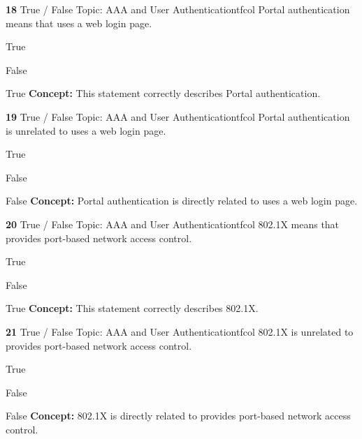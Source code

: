 \documentclass[10pt,a4paper]{article}
\begin{document}
\begin{qcard}{\color{white}\textbf{18} \hfill \small True / False \textbar{} Topic: AAA and User Authentication}{tfcol}
Portal authentication means that uses a web login page.

\begin{qoptions}
\item True
\item False
\end{qoptions}
\begin{explainbox}{True}
\textbf{Concept:} This statement correctly describes Portal authentication.
\end{explainbox}
\end{qcard}

\begin{qcard}{\color{white}\textbf{19} \hfill \small True / False \textbar{} Topic: AAA and User Authentication}{tfcol}
Portal authentication is unrelated to uses a web login page.

\begin{qoptions}
\item True
\item False
\end{qoptions}
\begin{explainbox}{False}
\textbf{Concept:} Portal authentication is directly related to uses a web login page.
\end{explainbox}
\end{qcard}

\begin{qcard}{\color{white}\textbf{20} \hfill \small True / False \textbar{} Topic: AAA and User Authentication}{tfcol}
802.1X means that provides port-based network access control.

\begin{qoptions}
\item True
\item False
\end{qoptions}
\begin{explainbox}{True}
\textbf{Concept:} This statement correctly describes 802.1X.
\end{explainbox}
\end{qcard}

\begin{qcard}{\color{white}\textbf{21} \hfill \small True / False \textbar{} Topic: AAA and User Authentication}{tfcol}
802.1X is unrelated to provides port-based network access control.

\begin{qoptions}
\item True
\item False
\end{qoptions}
\begin{explainbox}{False}
\textbf{Concept:} 802.1X is directly related to provides port-based network access control.
\end{explainbox}
\end{qcard}
\end{document}
